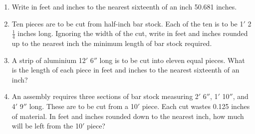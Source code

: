 \documentclass[12pt,fleqn]{article} %
\begin{document}
\begin{enumerate}
  \item Write in feet and inches to the nearest sixteenth of an inch 50.681 inches. 
  \spacing

  \item Ten pieces are to be cut from half-inch bar stock. Each of the ten is to be 1$'$ 2$\frac{1}{4}$ inches long. Ignoring the width of the cut, write in feet and inches rounded up to the nearest inch the minimum length of bar stock required. 
  \spacing

  \item A strip of aluminium 12$'$ 6$''$ long is to be cut into eleven equal pieces. What is the length of each piece in feet and inches to the nearest sixteenth of an inch? 
  \spacing

  \item An assembly requires three sections of bar stock measuring 2$'$ 6$''$, 1$'$ 10$''$, and 4$'$ 9$''$ long. These are to be cut from a 10$'$ piece. Each cut wastes 0.125 inches of material. In feet and inches rounded down to the nearest inch, how much will be left from the 10$'$ piece? 
  \spacing

\end{enumerate}
\end{document}
